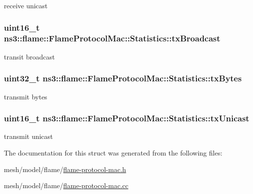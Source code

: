 receive unicast 

\subsubsection[{\texorpdfstring{tx\+Broadcast}{txBroadcast}}]{\setlength{\rightskip}{0pt plus 5cm}uint16\+\_\+t ns3\+::flame\+::\+Flame\+Protocol\+Mac\+::\+Statistics\+::tx\+Broadcast}\hypertarget{structns3_1_1flame_1_1FlameProtocolMac_1_1Statistics_a623867ef050869878f117b897c84ad3c}{}\label{structns3_1_1flame_1_1FlameProtocolMac_1_1Statistics_a623867ef050869878f117b897c84ad3c}


transit broadcast 

\subsubsection[{\texorpdfstring{tx\+Bytes}{txBytes}}]{\setlength{\rightskip}{0pt plus 5cm}uint32\+\_\+t ns3\+::flame\+::\+Flame\+Protocol\+Mac\+::\+Statistics\+::tx\+Bytes}\hypertarget{structns3_1_1flame_1_1FlameProtocolMac_1_1Statistics_a66c4802b2e3e3f367de9b842e36d9536}{}\label{structns3_1_1flame_1_1FlameProtocolMac_1_1Statistics_a66c4802b2e3e3f367de9b842e36d9536}


transmit bytes 

\subsubsection[{\texorpdfstring{tx\+Unicast}{txUnicast}}]{\setlength{\rightskip}{0pt plus 5cm}uint16\+\_\+t ns3\+::flame\+::\+Flame\+Protocol\+Mac\+::\+Statistics\+::tx\+Unicast}\hypertarget{structns3_1_1flame_1_1FlameProtocolMac_1_1Statistics_a536fc0b2aeb6ac3d81221a6ed9ca07e2}{}\label{structns3_1_1flame_1_1FlameProtocolMac_1_1Statistics_a536fc0b2aeb6ac3d81221a6ed9ca07e2}


transmit unicast 



The documentation for this struct was generated from the following files\+:\begin{DoxyCompactItemize}
\item 
mesh/model/flame/\hyperlink{flame-protocol-mac_8h}{flame-\/protocol-\/mac.\+h}\item 
mesh/model/flame/\hyperlink{flame-protocol-mac_8cc}{flame-\/protocol-\/mac.\+cc}\end{DoxyCompactItemize}
